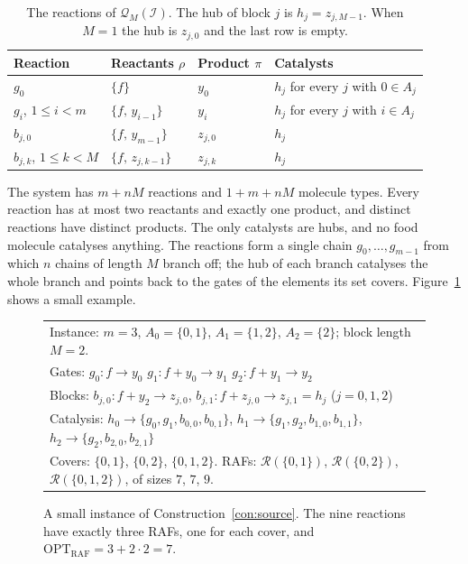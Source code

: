 \documentclass[11pt,a4paper]{article}
\theoremstyle{plain}
\theoremstyle{definition}
\theoremstyle{remark}
\newcommand{\OPT}{\mathrm{OPT}}
\newcommand{\RAF}{\mathrm{RAF}}
\newcommand{\optraf}{\OPT_{\RAF}}
\newcommand{\cQ}{\mathcal{Q}}
\newcommand{\cR}{\mathcal{R}}
\newcommand{\cI}{\mathcal{I}}
\begin{document}
\begin{table}[ht]
\centering
\begin{tabular}{@{}llll@{}}
\toprule
Reaction & Reactants $\rho$ & Product $\pi$ & Catalysts \\
\midrule
$g_0$ & $\{f\}$ & $y_0$ & $h_j$ for every $j$ with $0\in A_j$ \\
$g_i$, $1\le i<m$ & $\{f,\,y_{i-1}\}$ & $y_i$ & $h_j$ for every $j$ with $i\in A_j$ \\
$b_{j,0}$ & $\{f,\,y_{m-1}\}$ & $z_{j,0}$ & $h_j$ \\
$b_{j,k}$, $1\le k<M$ & $\{f,\,z_{j,k-1}\}$ & $z_{j,k}$ & $h_j$ \\
\bottomrule
\end{tabular}
\caption{The reactions of $\cQ_M(\cI)$. The hub of block $j$ is $h_j=z_{j,M-1}$. When $M=1$ the hub is $z_{j,0}$ and the last row is empty.}
\label{tab:construction}
\end{table}

The system has $m+nM$ reactions and $1+m+nM$ molecule types. Every reaction has at most two reactants and exactly one product, and distinct reactions have distinct products. The only catalysts are hubs, and no food molecule catalyses anything. The reactions form a single chain $g_0,\dots,g_{m-1}$ from which $n$ chains of length $M$ branch off; the hub of each branch catalyses the whole branch and points back to the gates of the elements its set covers. Figure~\ref{fig:example} shows a small example.

\begin{figure}[ht]
\centering
\begin{tabular}{@{}l@{}}
Instance: $m=3$, $A_0=\{0,1\}$, $A_1=\{1,2\}$, $A_2=\{2\}$; block length $M=2$.\\[4pt]
Gates: \quad $g_0\colon f\to y_0$ \quad $g_1\colon f+y_0\to y_1$ \quad $g_2\colon f+y_1\to y_2$\\[2pt]
Blocks: \quad $b_{j,0}\colon f+y_2\to z_{j,0}$, \quad $b_{j,1}\colon f+z_{j,0}\to z_{j,1}=h_j$ \quad ($j=0,1,2$)\\[2pt]
Catalysis: \quad $h_0\to\{g_0,g_1,b_{0,0},b_{0,1}\}$, \quad $h_1\to\{g_1,g_2,b_{1,0},b_{1,1}\}$, \quad $h_2\to\{g_2,b_{2,0},b_{2,1}\}$\\[4pt]
Covers: $\{0,1\}$, $\{0,2\}$, $\{0,1,2\}$. \quad RAFs: $\cR(\{0,1\})$, $\cR(\{0,2\})$, $\cR(\{0,1,2\})$, of sizes $7$, $7$, $9$.
\end{tabular}
\caption{A small instance of Construction~\ref{con:source}. The nine reactions have exactly three RAFs, one for each cover, and $\optraf=3+2\cdot 2=7$.}
\label{fig:example}
\end{figure}
\end{document}
